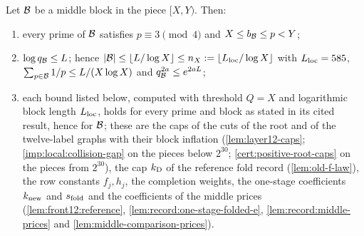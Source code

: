 \begin{lemma}\label{lem:record:local-domain}
Let $\mathcal B$ be a middle block in the piece $[X,Y)$. Then:
\begin{enumerate}[label=(\roman*)]
\item every prime of $\mathcal B$ satisfies $p\equiv3\pmod4$ and
 $X\le b_{\mathcal B}\le p<Y$;
\item $\log q_{\mathcal B}\le L$; hence
 $|\mathcal B|\le\lfloor L/\log X\rfloor\le n_X:=\lfloor L_{\rm loc}/\log X\rfloor$
 with $L_{\rm loc}=585$, $\sum_{p\in\mathcal B}1/p\le L/(X\log X)$ and
 $q_{\mathcal B}^{2a}\le e^{2aL}$;
\item each bound listed below, computed with threshold $Q=X$ and
 logarithmic block length $L_{\rm loc}$, holds for every prime and block as
 stated in its cited result, hence for $\mathcal B$; these are the
 caps of the cuts of the root and of the twelve-label graphs with their block
 inflation (\cref{lem:layer12-caps}; \cref{imp:local:collision-gap} on the pieces
 below $2^{30}$; \cref{cert:positive-root-caps} on the pieces from $2^{30}$), the cap $k_{\rm D}$ of the reference fold record
 (\cref{lem:old-f-law}), the row constants $f_j,h_j$, the completion weights,
 the one-stage coefficients $k_{\rm new}$ and $s_{\rm fold}$ and the
 coefficients of the middle prices (\cref{lem:front12:reference},
 \cref{lem:record:one-stage-folded-e}, \cref{lem:record:middle-prices} and
 \cref{lem:middle-comparison-prices}).
\end{enumerate}
\end{lemma}

